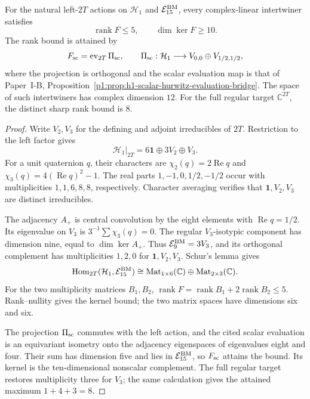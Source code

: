 \documentclass[11pt,a4paper]{article}
\begin{document}
\begin{proposition}
\label{p2e:prop:sharp-natural-2t-rank}
For the natural left-\(2T\) actions on \(\mathcal H_1\) and
\(\mathcal E_{15}^{\rm BM}\), every complex-linear intertwiner satisfies
\[
 \operatorname{rank}F\le5,\qquad \dim\ker F\ge10.
\]
The rank bound is attained by
\[
 F_{\rm sc}=\operatorname{ev}_{2T}\Pi_{\rm sc},
 \qquad
 \Pi_{\rm sc}:\mathcal H_1\longrightarrow
 V_{0,0}\oplus V_{1/2,1/2},
\]
where the projection is orthogonal and the scalar evaluation map is that of
Paper~I-B, Proposition~\ref{p1:prop:h1-scalar-hurwitz-evaluation-bridge}.
The space of such intertwiners has complex dimension \(12\).  For the full
regular target \(\mathbb C^{2T}\), the distinct sharp rank bound is \(8\).
\end{proposition}
\begin{proof}
Write \(V_2,V_3\) for the defining and adjoint irreducibles of \(2T\).
Restriction to the left factor gives
\[
 \mathcal H_1|_{2T}=6\mathbf1\oplus3V_2\oplus V_3.
\]
For a unit quaternion \(q\), their characters are
\(\chi_2(q)=2\operatorname{Re}q\) and
\(\chi_3(q)=4(\operatorname{Re}q)^2-1\).
The real parts \(1,-1,0,1/2,-1/2\) occur with multiplicities
\(1,1,6,8,8\), respectively. Character averaging verifies that
\(\mathbf1,V_2,V_3\) are distinct irreducibles.

The adjacency \(A_+\) is central convolution by the eight elements with
\(\operatorname{Re}q=1/2\). Its eigenvalue on \(V_3\) is
\(3^{-1}\sum\chi_3(q)=0\). The regular \(V_3\)-isotypic component has
dimension nine, equal to \(\dim\ker A_+\). Thus
\(\mathcal E_9^{\rm BM}=3V_3\), and its orthogonal complement has
multiplicities \(1,2,0\) for \(\mathbf1,V_2,V_3\).
Schur's lemma gives
\[
 \operatorname{Hom}_{2T}(\mathcal H_1,\mathcal E_{15}^{\rm BM})
 \cong\operatorname{Mat}_{1\times6}(\mathbb C)
 \oplus\operatorname{Mat}_{2\times3}(\mathbb C).
\]
For the two multiplicity matrices \(B_1,B_2\),
\(\operatorname{rank}F=\operatorname{rank}B_1+2\operatorname{rank}B_2\le5\).
Rank--nullity gives the kernel bound; the two matrix spaces have dimensions
six and six.

The projection \(\Pi_{\rm sc}\) commutes with the left action, and the
cited scalar evaluation is an equivariant isometry onto the adjacency
eigenspaces of eigenvalues eight and four. Their sum has dimension five
and lies in \(\mathcal E_{15}^{\rm BM}\), so \(F_{\rm sc}\) attains the
bound. Its kernel is the ten-dimensional nonscalar complement.
The full regular target restores multiplicity three for \(V_3\); the same
calculation gives the attained maximum \(1+4+3=8\).
\end{proof}
\end{document}
